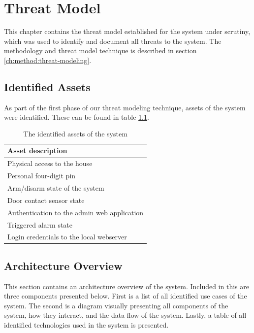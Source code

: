 \chapter{Threat Model} \label{ch:threat-model}
This chapter contains the threat model established for the system under scrutiny, which was used to identify and document all threats to the system. The methodology and threat model technique is described in section \ref{ch:method:threat-modeling}.

\section{Identified Assets}
As part of the first phase of our threat modeling technique, assets of the system were identified. These can be found in table \ref{tb:assets}.
\begin{table}[!ht]
    \centering
    \begin{tabular}{l}
        \hline
        \textbf{Asset description}
        \\ \hline
        Physical access to the house
        \\
        Personal four-digit pin
        \\
        Arm/disarm state of the system
        \\
        Door contact sensor state
        \\
        Authentication to the admin web application
        \\
        Triggered alarm state
        \\
        Login credentials to the local webserver
        \\ \hline
    \end{tabular}
    \caption{The identified assets of the system}
    \label{tb:assets}
\end{table}

\section{Architecture Overview}
This section contains an architecture overview of the system. Included in this are three components presented below. First is a list of all identified use cases of the system. The second is a diagram visually presenting all components of the system, how they interact, and the data flow of the system. Lastly, a table of all identified technologies used in the system is presented.

